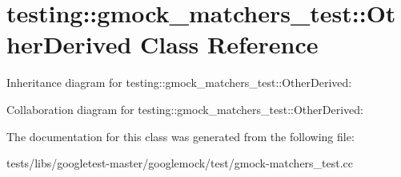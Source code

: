 \hypertarget{classtesting_1_1gmock__matchers__test_1_1OtherDerived}{}\section{testing\+:\+:gmock\+\_\+matchers\+\_\+test\+:\+:Other\+Derived Class Reference}
\label{classtesting_1_1gmock__matchers__test_1_1OtherDerived}


Inheritance diagram for testing\+:\+:gmock\+\_\+matchers\+\_\+test\+:\+:Other\+Derived\+:


Collaboration diagram for testing\+:\+:gmock\+\_\+matchers\+\_\+test\+:\+:Other\+Derived\+:


The documentation for this class was generated from the following file\+:\begin{DoxyCompactItemize}
\item 
tests/libs/googletest-\/master/googlemock/test/gmock-\/matchers\+\_\+test.\+cc\end{DoxyCompactItemize}
